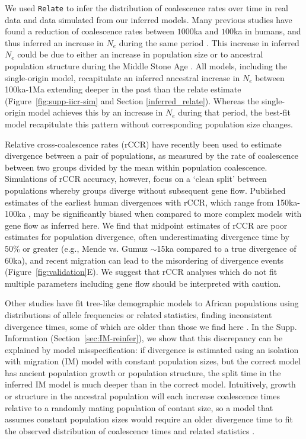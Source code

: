 \documentclass[]{article}
\begin{document}
We used \texttt{Relate} \citep{Speidel2019-nj} to infer the distribution of
coalescence rates over time in real data and data simulated from our inferred
models. Many previous studies have found a reduction of coalescence rates
between $1000$ka and $100$ka in humans, and thus inferred an increase in $N_e$
during the same period \citep{Li2011-le}.  This increase in inferred $N_e$
could be due to either an increase in population size or to ancestral
population structure during the Middle Stone Age \citep{Mazet2016-wn}.  All
models, including the single-origin model, recapitulate an inferred ancestral
increase in $N_e$ between 100ka-1Ma extending deeper in the past than the
relate estimate (Figure~\ref{fig:supp-iicr-sim} and Section
\ref{inferred_relate}). Whereas the single-origin model achieves this by an
increase in $N_e$ during that period, the best-fit model recapitulate this
pattern without corresponding population size changes.     

Relative cross-coalescence rates (rCCR) have recently been used to estimate
divergence between a pair of populations, as measured by the rate of
coalescence between two groups divided by the mean within population
coalescence. Simulations of rCCR accuracy, however, focus on a ‘clean split’
between populations whereby groups diverge without subsequent gene flow.
Published estimates of the earliest human divergences with rCCR, which range
from 150ka-100ka \citep{Bergstrom2021-iw}, may be significantly biased when
compared to more complex models with gene flow as inferred here. We find that
midpoint estimates of rCCR are poor estimates for population divergence, often
underestimating divergence time by 50\% or greater (e.g., Mende vs. Gumuz
$\sim$15ka compared to a true divergence of 60ka), and recent migration can
lead to the misordering of divergence events (Figure~\ref{fig:validation}E). We
suggest that rCCR analyses which do not fit multiple parameters including gene
flow should be interpreted with caution.

Other studies have fit tree-like demographic models to African populations
using distributions of allele frequencies or related statistics, finding
inconsistent divergence times, some of which are older than those we find here
\cite{Henn2018-rf,Bergstrom2021-iw}. In the Supp. Information
(Section~\ref{sec:IM-reinfer}), we show that this discrepancy can be explained
by model misspecification: if divergence is estimated using an isolation with
migration (IM) model with constant population sizes, but the correct model has
ancient population growth or population structure, the split time in the
inferred IM model is much deeper than in the correct model. Intuitively, growth
or structure in the ancestral population will each increase coalescence times
relative to a randomly mating population of contant size, so a model that
assumes constant population sizes would require an older divergence time to fit
the observed distribution of coalescence times and related statistics
\citep{Momigliano2021-th,Shchur2022-wa}.  
\end{document}
